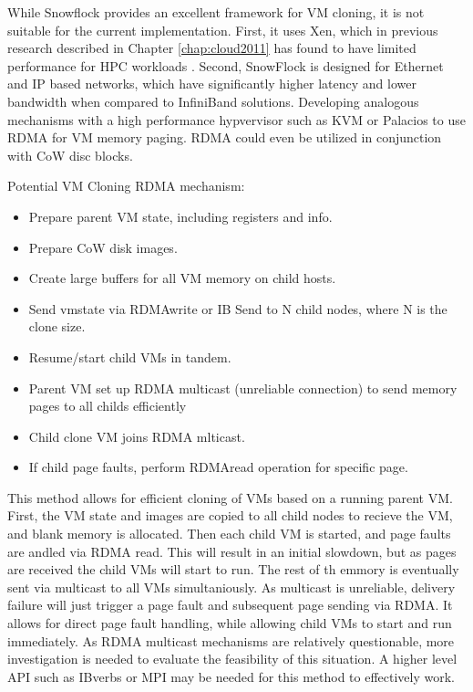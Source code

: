 While Snowflock provides an excellent framework for VM cloning, it is not suitable for the current implementation. First, it uses Xen, which in previous research described in Chapter \ref{chap:cloud2011} has found to have limited performance for HPC workloads \cite{Younge2011cloud}.  Second, SnowFlock is designed for Ethernet and IP based networks, which have significantly higher latency and lower bandwidth when compared to InfiniBand solutions.  Developing analogous mechanisms with a high performance hypvervisor such as KVM or Palacios \cite{lange2010palacios} to use RDMA for VM memory paging. RDMA could even be utilized in conjunction with CoW disc blocks.

Potential VM Cloning RDMA mechanism:
\begin{itemize}
\item Prepare parent VM state, including registers and info.
\item Prepare CoW disk images.
\item Create large buffers for all VM memory on child hosts. 
\item Send vmstate via RDMAwrite or IB Send to N child nodes, where N is the clone size.
\item Resume/start child VMs in tandem. 
\item Parent VM set up RDMA multicast (unreliable connection) to send memory pages to all childs efficiently
\item Child clone VM joins RDMA mlticast.
\item If child page faults, perform RDMAread operation for specific page. 
\end{itemize}

This method allows for efficient cloning of VMs based on a running parent VM. First, the VM state and images are copied to all child nodes to recieve the VM, and blank memory is allocated. Then each child VM is started, and page faults are andled via RDMA read. This will result in an initial slowdown, but as pages are received the child VMs will start to run. The rest of th emmory is eventually sent via multicast to all VMs simultaniously.   As multicast is unreliable, delivery failure will just trigger a page fault and subsequent page sending via RDMA.  It allows for direct page fault handling, while allowing child VMs to start and run immediately. As RDMA multicast mechanisms are relatively questionable,  more investigation is needed to evaluate the feasibility of this situation. A higher level API such as IBverbs or MPI may be needed for this method to effectively work.  

